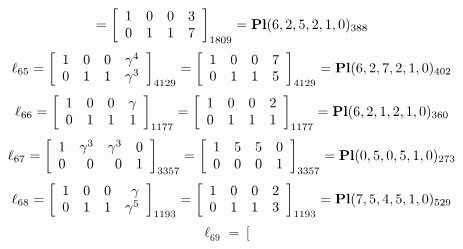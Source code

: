 \documentclass{article}
\begin{document}
{$$=
\left[
\begin{array}{*{4}c}
1  & 0  & 0  & 3\\
0  & 1  & 1  & 7\\
\end{array}
\right]_{1809}
={\rm\bf Pl}(6,2,5,2,1,0 )_{388}$$
$$
\ell_{65} = 
\left[
\begin{array}{*{4}{r}}
1 & 0 & 0 & \gamma^{4}\\
0 & 1 & 1 & \gamma^{3}\\
\end{array}
\right]
_{4129}
=
\left[
\begin{array}{*{4}c}
1  & 0  & 0  & 7\\
0  & 1  & 1  & 5\\
\end{array}
\right]_{4129}
={\rm\bf Pl}(6,2,7,2,1,0 )_{402}$$
$$
\ell_{66} = 
\left[
\begin{array}{*{4}{r}}
1 & 0 & 0 & \gamma \\
0 & 1 & 1 & 1\\
\end{array}
\right]
_{1177}
=
\left[
\begin{array}{*{4}c}
1  & 0  & 0  & 2\\
0  & 1  & 1  & 1\\
\end{array}
\right]_{1177}
={\rm\bf Pl}(6,2,1,2,1,0 )_{360}$$
$$
\ell_{67} = 
\left[
\begin{array}{*{4}{r}}
1 & \gamma^{3} & \gamma^{3} & 0\\
0 & 0 & 0 & 1\\
\end{array}
\right]
_{3357}
=
\left[
\begin{array}{*{4}c}
1  & 5  & 5  & 0\\
0  & 0  & 0  & 1\\
\end{array}
\right]_{3357}
={\rm\bf Pl}(0,5,0,5,1,0 )_{273}$$
$$
\ell_{68} = 
\left[
\begin{array}{*{4}{r}}
1 & 0 & 0 & \gamma \\
0 & 1 & 1 & \gamma^{5}\\
\end{array}
\right]
_{1193}
=
\left[
\begin{array}{*{4}c}
1  & 0  & 0  & 2\\
0  & 1  & 1  & 3\\
\end{array}
\right]_{1193}
={\rm\bf Pl}(7,5,4,5,1,0 )_{529}$$
$$
\ell_{69} = 
\left[
\begin{array}{*{4}{r}}

\end{array}$$}
\end{document}
